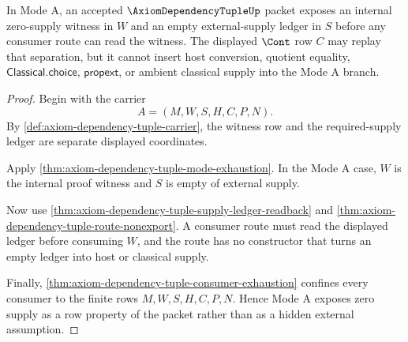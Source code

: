 \begin{theorem}
\label{thm:axiom-dependency-tuple-zero-supply-row-separation}
In Mode A, an accepted $\AxiomDependencyTupleUp$ packet exposes an internal
zero-supply witness in $W$ and an empty external-supply ledger in $S$ before any
consumer route can read the witness. The displayed $\Cont$ row $C$ may replay
that separation, but it cannot insert host conversion, quotient equality,
$\mathsf{Classical.choice}$, $\mathsf{propext}$, or ambient classical supply into
the Mode A branch.
\end{theorem}
\begin{proof}
Begin with the carrier
$$
A=(M,W,S,H,C,P,N).
$$
By \autoref{def:axiom-dependency-tuple-carrier}, the witness row and the
required-supply ledger are separate displayed coordinates.

Apply \autoref{thm:axiom-dependency-tuple-mode-exhaustion}. In the Mode A case,
$W$ is the internal proof witness and $S$ is empty of external supply.

Now use \autoref{thm:axiom-dependency-tuple-supply-ledger-readback} and
\autoref{thm:axiom-dependency-tuple-route-nonexport}. A consumer route must read
the displayed ledger before consuming $W$, and the route has no constructor that
turns an empty ledger into host or classical supply.

Finally, \autoref{thm:axiom-dependency-tuple-consumer-exhaustion} confines every
consumer to the finite rows $M,W,S,H,C,P,N$. Hence Mode A exposes zero supply as
a row property of the packet rather than as a hidden external assumption.
\end{proof}

